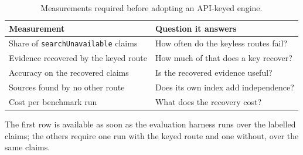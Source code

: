 \begin{table}[ht]
\centering
\caption{Measurements required before adopting an API-keyed engine.}
\label{tab:future-keyed-measurements}
\begin{tabular}{@{}ll@{}}
\toprule
\textbf{Measurement} & \textbf{Question it answers} \\
\midrule
Share of \texttt{searchUnavailable} claims & How often do the keyless routes fail? \\
Evidence recovered by the keyed route & How much of that does a key recover? \\
Accuracy on the recovered claims & Is the recovered evidence useful? \\
Sources found by no other route & Does its own index add independence? \\
Cost per benchmark run & What does the recovery cost? \\
\bottomrule
\end{tabular}
\end{table}

The first row is available as soon as the evaluation harness runs over
the labelled claims; the others require one run with the keyed route
and one without, over the same claims.
